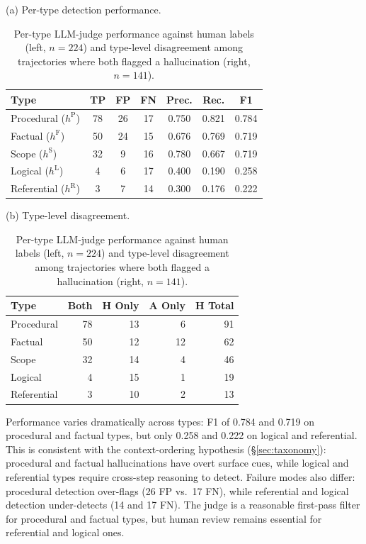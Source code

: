 \documentclass{article}
\begin{document}
\begin{table}[t]
\caption{Per-type LLM-judge performance against human labels (left, $n=224$) and type-level disagreement among trajectories where both flagged a hallucination (right, $n=141$).}
\label{tab:per_type_combined}
\centering
\begin{minipage}[t]{0.54\linewidth}
\centering
{\footnotesize (a) Per-type detection performance.}\\[2pt]
\footnotesize
\setlength{\tabcolsep}{3pt}
\begin{tabular}{lcccccc}
\toprule
\textbf{Type} & \textbf{TP} & \textbf{FP} & \textbf{FN} & \textbf{Prec.} & \textbf{Rec.} & \textbf{F1} \\
\midrule
Procedural ($h^{\text{P}}$)   & 78 & 26 & 17 & 0.750 & 0.821 & 0.784 \\
Factual ($h^{\text{F}}$)      & 50 & 24 & 15 & 0.676 & 0.769 & 0.719 \\
Scope ($h^{\text{S}}$)        & 32 &  9 & 16 & 0.780 & 0.667 & 0.719 \\
Logical ($h^{\text{L}}$)      &  4 &  6 & 17 & 0.400 & 0.190 & 0.258 \\
Referential ($h^{\text{R}}$)  &  3 &  7 & 14 & 0.300 & 0.176 & 0.222 \\
\bottomrule
\end{tabular}
\end{minipage}\hfill
\begin{minipage}[t]{0.44\linewidth}
\centering
{\footnotesize (b) Type-level disagreement.}\\[2pt]
\footnotesize
\setlength{\tabcolsep}{3pt}
\begin{tabular}{lrrrr}
\toprule
\textbf{Type} & \textbf{Both} & \textbf{H Only} & \textbf{A Only} & \textbf{H Total} \\
\midrule
Procedural   & 78 & 13 &  6 & 91 \\
Factual      & 50 & 12 & 12 & 62 \\
Scope        & 32 & 14 &  4 & 46 \\
Logical      &  4 & 15 &  1 & 19 \\
Referential  &  3 & 10 &  2 & 13 \\
\bottomrule
\end{tabular}
\end{minipage}
\end{table}

Performance varies dramatically across types: F1 of 0.784 and 0.719 on procedural and factual types, but only 0.258 and 0.222 on logical and referential. This is consistent with the context-ordering hypothesis (\S\ref{sec:taxonomy}): procedural and factual hallucinations have overt surface cues, while logical and referential types require cross-step reasoning to detect. Failure modes also differ: procedural detection over-flags (26 FP vs.\ 17 FN), while referential and logical detection under-detects (14 and 17 FN). The judge is a reasonable first-pass filter for procedural and factual types, but human review remains essential for referential and logical ones.
\end{document}
